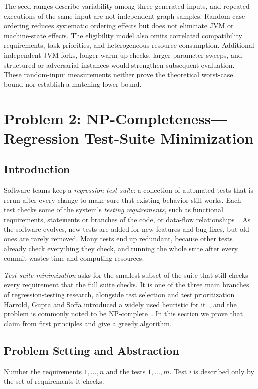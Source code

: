 \documentclass[conference]{IEEEtran}
\theoremstyle{definition}
\theoremstyle{remark}
\begin{document}
The seed ranges describe variability among three generated inputs, and repeated
executions of the same input are not independent graph samples. Random case
ordering reduces systematic ordering effects but does not eliminate JVM or
machine-state effects. The eligibility model also omits correlated compatibility
requirements, task priorities, and heterogeneous resource consumption.
Additional independent JVM forks, longer warm-up checks, larger parameter
sweeps, and structured or adversarial instances would strengthen subsequent
evaluation. These random-input measurements neither prove the theoretical
worst-case bound nor establish a matching lower bound.


\section{Problem 2: NP-Completeness---Regression Test-Suite Minimization}
\label{sec:p2}

\subsection{Introduction}
\label{sec:p2-intro}
Software teams keep a \emph{regression test suite}: a collection of automated
tests that is rerun after every change to make sure that existing behavior
still works. Each test checks some of the system's \emph{testing
requirements}, such as functional requirements, statements or branches of the
code, or data-flow relationships~\cite{harrold1993}. As the software evolves,
new tests are added for new features and bug fixes, but old ones are rarely
removed. Many tests end up redundant, because other tests already check
everything they check, and running the whole suite after every commit wastes
time and computing resources.

\emph{Test-suite minimization} asks for the smallest subset of the suite that
still checks every requirement that the full suite checks. It is one of the
three main branches of regression-testing research, alongside test selection
and test prioritization~\cite{yoo2012}. Harrold, Gupta and Soffa introduced a
widely used heuristic for it~\cite{harrold1993}, and the problem is commonly
noted to be NP-complete~\cite{yoo2012}. In this section we prove
that claim from first principles and give a greedy algorithm.

\subsection{Problem Setting and Abstraction}
Number the requirements $1,\dots,n$ and the tests $1,\dots,m$. Test $i$ is
described only by the set of requirements it checks.
\end{document}
